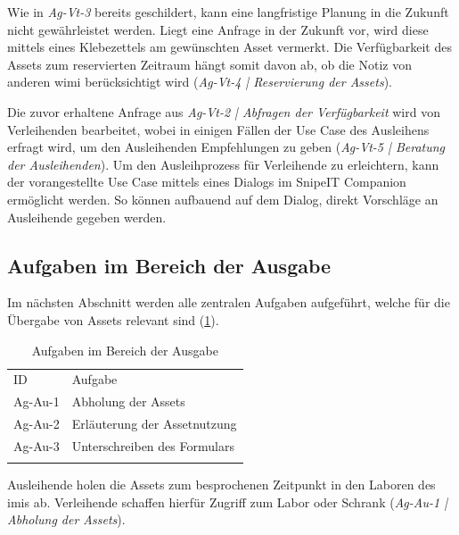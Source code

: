 Wie in \textit{Ag-Vt-3} bereits geschildert, kann eine langfristige Planung
in die Zukunft nicht gewährleistet werden. Liegt eine Anfrage in der Zukunft vor, wird diese mittels
eines Klebezettels am gewünschten Asset vermerkt. Die Verfügbarkeit des Assets zum reservierten
Zeitraum hängt somit davon ab, ob die Notiz von anderen \ac{wimi} berücksichtigt wird
(\textit{Ag-Vt-4 | Reservierung der Assets}). 

Die zuvor erhaltene Anfrage aus \textit{Ag-Vt-2 | Abfragen der Verfügbarkeit} wird von Verleihenden
bearbeitet, wobei in einigen Fällen der Use Case des Ausleihens erfragt wird, um den Ausleihenden
Empfehlungen zu geben (\textit{Ag-Vt-5 | Beratung der Ausleihenden}). Um den Ausleihprozess für
Verleihende zu erleichtern, kann der vorangestellte Use Case mittels eines Dialogs im SnipeIT
Companion ermöglicht werden. So können aufbauend auf dem Dialog, direkt Vorschläge an Ausleihende
gegeben werden.


\subsection{Aufgaben im Bereich der Ausgabe}
Im nächsten Abschnitt werden alle zentralen Aufgaben aufgeführt, welche für die Übergabe von Assets
relevant sind (\ref{table:Ag-Au}).

\begin{table}[h]
        \centering
        \caption{Aufgaben im Bereich der Ausgabe}
        \begin{tabular}{ll}
                \arrayrulecolor{maincolor}\hline
                \sffamily\color{maincolor}ID & \sffamily\color{maincolor}Aufgabe \\
                \arrayrulecolor{maincolor}\hline
                Ag-Au-1                      & Abholung der Assets \\
                Ag-Au-2                      & Erläuterung der Assetnutzung \\
                Ag-Au-3                      & Unterschreiben des Formulars \\
                \arrayrulecolor{maincolor}\hline
        \end{tabular}
        \label{table:Ag-Au}
\end{table}

Ausleihende holen die Assets zum besprochenen Zeitpunkt in den Laboren des \ac{imis} ab. Verleihende
schaffen hierfür Zugriff zum Labor oder Schrank (\textit{Ag-Au-1 | Abholung der Assets}). 

